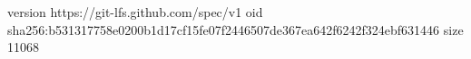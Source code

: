 version https://git-lfs.github.com/spec/v1
oid sha256:b531317758e0200b1d17cf15fe07f2446507de367ea642f6242f324ebf631446
size 11068

